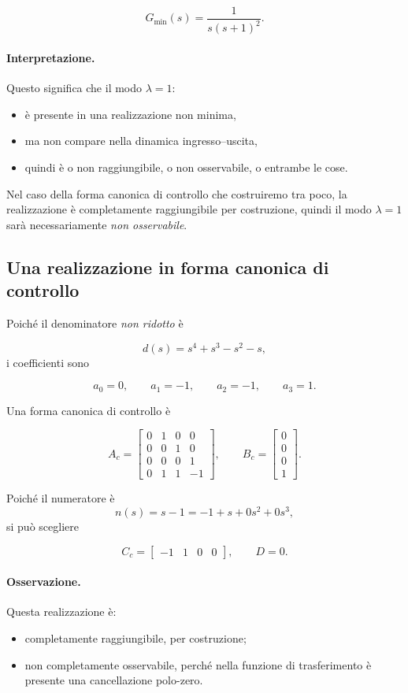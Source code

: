 \[
G_{\min}(s)=\frac{1}{s(s+1)^2}.
\]

\paragraph{Interpretazione.}
Questo significa che il modo \(\lambda=1\):
\begin{itemize}
    \item è presente in una realizzazione non minima,
    \item ma non compare nella dinamica ingresso--uscita,
    \item quindi è o non raggiungibile, o non osservabile, o entrambe le cose.
\end{itemize}

Nel caso della forma canonica di controllo che costruiremo tra poco, la realizzazione è completamente raggiungibile per costruzione, quindi il modo \(\lambda=1\) sarà necessariamente \emph{non osservabile}.

\bigskip

\subsection{Una realizzazione in forma canonica di controllo}

Poiché il denominatore \emph{non ridotto} è

\[
d(s)=s^4+s^3-s^2-s,
\]
i coefficienti sono

\[
a_0=0,\qquad a_1=-1,\qquad a_2=-1,\qquad a_3=1.
\]

Una forma canonica di controllo è

\[
A_c=
\begin{bmatrix}
0 & 1 & 0 & 0\\
0 & 0 & 1 & 0\\
0 & 0 & 0 & 1\\
0 & 1 & 1 & -1
\end{bmatrix},
\qquad
B_c=
\begin{bmatrix}
0\\0\\0\\1
\end{bmatrix}.
\]

Poiché il numeratore è
\[
n(s)=s-1=-1+s+0s^2+0s^3,
\]
si può scegliere

\[
C_c=
\begin{bmatrix}
-1 & 1 & 0 & 0
\end{bmatrix},
\qquad
D=0.
\]

\paragraph{Osservazione.}
Questa realizzazione è:
\begin{itemize}
    \item completamente raggiungibile, per costruzione;
    \item non completamente osservabile, perché nella funzione di trasferimento è presente una cancellazione polo-zero.
\end{itemize}

